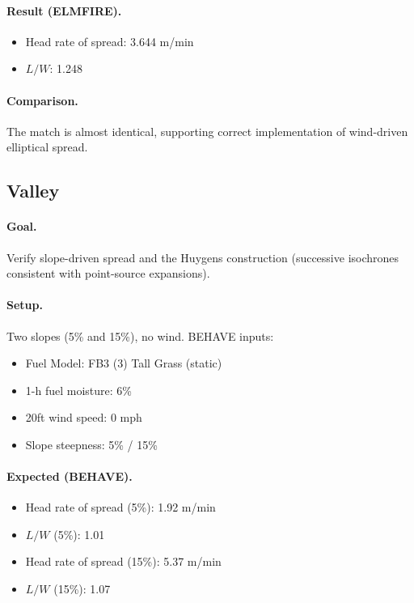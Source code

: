 \paragraph{Result (ELMFIRE).}


\begin{itemize}
    \item Head rate of spread: 3.644 m/min
    \item $L/W$: 1.248
\end{itemize}
\paragraph{Comparison.} The match is almost identical, supporting correct implementation of wind-driven elliptical spread.

\clearpage
\subsection{Valley}

\paragraph{Goal.} Verify slope-driven spread and the Huygens construction (successive isochrones consistent with point-source expansions).

\paragraph{Setup.} Two slopes (5\% and 15\%), no wind. BEHAVE inputs:

 \begin{itemize}
    \item Fuel Model: FB3 (3) Tall Grass (static)
    \item 1-h fuel moisture: 6\%
    \item 20ft wind speed: 0 mph
    \item Slope steepness: 5\% / 15\%
\end{itemize}
\paragraph{Expected (BEHAVE).}


\begin{itemize}
    \item Head rate of spread (5\%): 1.92 m/min
    \item $L/W$ (5\%): 1.01
    \item Head rate of spread (15\%): 5.37 m/min
    \item $L/W$ (15\%): 1.07
\end{itemize}
